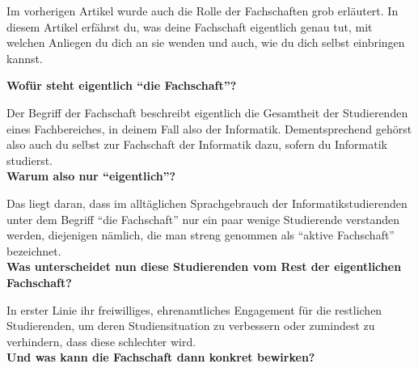 {Im vorherigen Artikel wurde auch die Rolle der Fachschaften grob erläutert. In diesem Artikel erfährst du, was deine Fachschaft eigentlich genau tut, mit welchen Anliegen du dich an sie wenden und auch, wie du dich selbst einbringen kannst.
}{
\textbf{Wofür steht eigentlich "`die Fachschaft"'?}

Der Begriff der Fachschaft beschreibt eigentlich die Gesamtheit der Studierenden eines Fachbereiches, in deinem Fall also der Informatik. Dementsprechend gehörst also auch du selbst zur Fachschaft der Informatik dazu, sofern du Informatik studierst.\\

\textbf{Warum also nur "`eigentlich"'?}

Das liegt daran, dass im alltäglichen Sprachgebrauch der Informatikstudierenden  unter dem Begriff "`die Fachschaft"' nur ein paar wenige Studierende verstanden werden, diejenigen nämlich, die man streng genommen als "`aktive Fachschaft"' bezeichnet.\\

\textbf{Was unterscheidet nun diese Studierenden vom Rest der eigentlichen Fachschaft?}

In erster Linie ihr freiwilliges, ehrenamtliches Engagement für die restlichen Studierenden, um deren Studiensituation zu verbessern oder zumindest zu verhindern, dass diese schlechter wird.\\

\textbf{Und was kann die Fachschaft dann konkret bewirken?}

}

